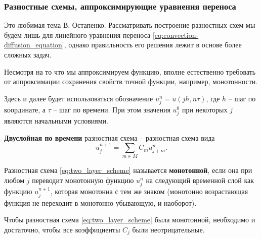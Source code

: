 \documentclass[../main.tex]{subfile}
\begin{document}
\subsubsection{Разностные схемы, аппроксимирующие уравнения переноса}
Это любимая тема В. Остапенко. Рассматривать построение разностных схем
мы будем лишь для линейного уравнения переноса
\eqref{eq:convection-diffusion_equation}, однако правильность его решения лежит
в основе более сложных задач.

Несмотря на то что мы аппроксимируем функцию, вполне естественно требовать от
аппроксимации сохранения свойств точной функции, например, монотонности.

Здесь и далее будет использоваться обозначение $u_j^n=u(jh,n\tau)$, где $h$ --
шаг по координате, а $\tau$ -- шаг по времени. При этом значения $u^0_j$ при
некоторых $j$ являются начальными условиями.

\begin{define}\label{eq:two_layer_scheme}
	\textbf{Двуслойная по времени} разностная схема -- разностная схема вида
	\[u_j^{n+1}=\sum_{m\in M}C_mu_{j+m}^n.\]
\end{define}

\begin{define}\label{eq:monotonic_scheme}
	Разностная схема \eqref{eq:two_layer_scheme} называется
	\textbf{монотонной}, если она при любом $j$ переводит монотонную функцию
	$u_j^n$ на следующий временной слой как функцию $u_j^{n+1}$, которая
	монотонна с тем же знаком (монотонно возрастающая функция не переходит в
	монотонно убывающую, и наоборот).
\end{define}

\begin{theorem}
\label{eq:monotonic_scheme_criterion}
	Чтобы разностная схема \eqref{eq:two_layer_scheme} была монотонной,
	необходимо и достаточно, чтобы все коэффициенты $C_j$ были
	неотрицательные.
\end{theorem}
\end{document}
